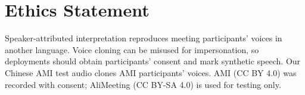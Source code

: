 \section*{Ethics Statement}

Speaker-attributed interpretation reproduces meeting participants' voices in another language. Voice cloning can be
misused for impersonation, so deployments should obtain participants' consent and mark synthetic speech. Our Chinese AMI
test audio clones AMI participants' voices. AMI (CC BY 4.0) was recorded with consent; AliMeeting (CC BY-SA 4.0) is used
for testing only.
